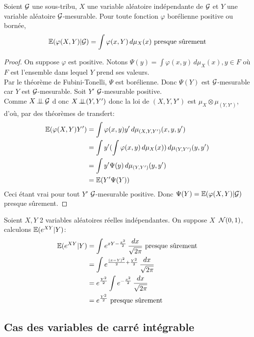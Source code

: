\documentclass[]{report}
\begin{document}
    \begin{prop}{}{}
        Soient $\mathcal{G}$ une sous-tribu, $X$ une variable aléatoire indépendante de $\mathcal{G}$ et $Y$ une variable aléatoire $\mathcal{G}$-mesurable. Pour toute fonction $\varphi$ borélienne positive ou bornée, 
        \[\mathbb{E}(\varphi(X,Y)|\mathcal{G})=\int \varphi(x,Y)\,d\mu_X(x)\text{ presque sûrement}\]
    \end{prop}

    \begin{proof}
        On suppose $\varphi$ est positive. Notons $\Psi(y)=\int \varphi(x,y)\,d\mu_X(x), y\in F$ où $F$ est l'ensemble dans lequel $Y$ prend ses valeurs.\\
        Par le théorème de Fubini-Tonelli, $\Psi$ est borélienne. Donc $\Psi(Y)$ est $\mathcal{G}$-mesurable car $Y$ est $\mathcal{G}$-mesurable. Soit $Y'$ $\mathcal{G}$-mesurable positive.\\
        Comme $X\operatorname{\perp \!\!\! \perp} \mathcal{G}$ d onc $X\operatorname{\perp \!\!\! \perp} (Y,Y')$ donc la loi de $(X,Y,Y')$ est $\mu_X\otimes \mu_{(Y,Y')}$, d'où, par des théorèmes de transfert:
        \begin{align*}
            \mathbb{E}(\varphi(X,Y)Y')&=\int \varphi(x,y)y'\,d\mu_{(X,Y,Y')}(x,y,y')\\
            &=\int y'(\int \varphi(x,y)\,d\mu_X(x))\,d\mu_{(Y,Y')}(y,y')\\
            &=\int y'\Psi (y)\,d\mu_{(Y,Y')}(y,y')\\
            &=\mathbb{E}(Y'\Psi(Y))
        \end{align*}
        Ceci étant vrai pour tout $Y'$ $\mathcal{G}$-mesurable positive. Donc $\Psi(Y)=\mathbb{E}(\varphi(X,Y)|\mathcal{G})$ presque sûrement.
    \end{proof}

    \begin{ex}{}{}
        Soient $X,Y$ 2 variables aléatoires réelles indépendantes. On suppose $X$~$\mathcal{N}(0,1)$, calculons $\mathbb{E}(e^{XY}|Y)$:
        \begin{align*}
            \mathbb{E}(e^{XY}|Y)&=\int e^{xY-\frac{x^2}{2}}\,\frac{dx}{\sqrt{2\pi}}\text{ presque sûrement}\\
            &= \int e^{\frac{(x-Y)^2}{2}+\frac{Y^2}{2}}\,\frac{dx}{\sqrt{2\pi}}\\
            &= e^{\frac{Y^2}{2}}\int e^{-\frac{x^2}{2}}\,\frac{dx}{\sqrt{2\pi}}\\
            &=e^{\frac{Y^2}{2}}\text{ presque sûrement}
        \end{align*}
    \end{ex}

    \subsection*{Cas des variables de carré intégrable}
\end{document}
